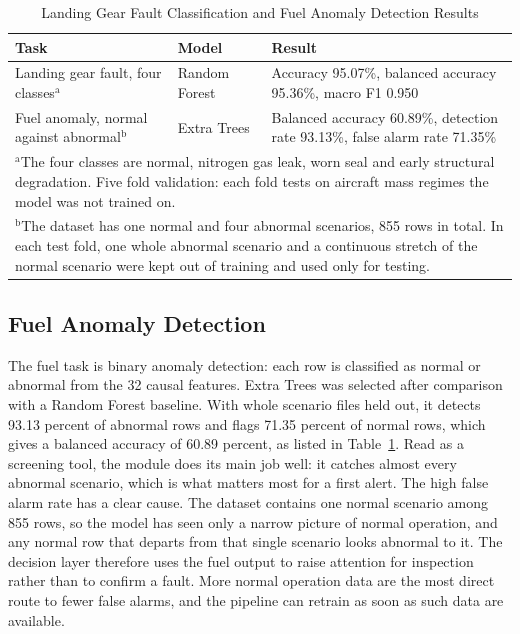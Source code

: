 \documentclass[conference]{IEEEtran}
\begin{document}
\begin{table}[htbp]
\caption{Landing Gear Fault Classification and Fuel Anomaly Detection Results}
\begin{center}
\footnotesize
\setlength{\tabcolsep}{3pt}
\begin{tabular}{|p{0.85in}|p{0.7in}|p{1.45in}|}
\hline
\textbf{Task} & \textbf{Model} & \textbf{Result} \\
\hline
Landing gear fault, four classes$^{\mathrm{a}}$ & Random Forest & Accuracy 95.07\%, balanced accuracy 95.36\%, macro F1 0.950 \\
\hline
Fuel anomaly, normal against abnormal$^{\mathrm{b}}$ & Extra Trees & Balanced accuracy 60.89\%, detection rate 93.13\%, false alarm rate 71.35\% \\
\hline
\multicolumn{3}{p{3.0in}}{$^{\mathrm{a}}$The four classes are normal, nitrogen gas leak, worn seal and early structural degradation. Five fold validation: each fold tests on aircraft mass regimes the model was not trained on.} \\
\multicolumn{3}{p{3.0in}}{$^{\mathrm{b}}$The dataset has one normal and four abnormal scenarios, 855 rows in total. In each test fold, one whole abnormal scenario and a continuous stretch of the normal scenario were kept out of training and used only for testing.}
\end{tabular}
\label{tab_lg}
\end{center}
\end{table}

\subsection{Fuel Anomaly Detection}
The fuel task is binary anomaly detection: each row is classified as normal or abnormal from the 32 causal features. Extra Trees was selected after comparison with a Random Forest baseline. With whole scenario files held out, it detects 93.13 percent of abnormal rows and flags 71.35 percent of normal rows, which gives a balanced accuracy of 60.89 percent, as listed in Table~\ref{tab_lg}. Read as a screening tool, the module does its main job well: it catches almost every abnormal scenario, which is what matters most for a first alert. The high false alarm rate has a clear cause. The dataset contains one normal scenario among 855 rows, so the model has seen only a narrow picture of normal operation, and any normal row that departs from that single scenario looks abnormal to it. The decision layer therefore uses the fuel output to raise attention for inspection rather than to confirm a fault. More normal operation data are the most direct route to fewer false alarms, and the pipeline can retrain as soon as such data are available.
\end{document}
